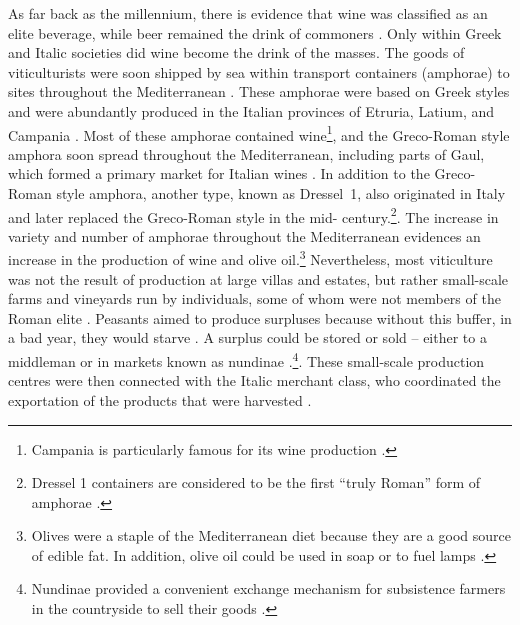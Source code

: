 As far back as the  millennium\BC, there is evidence that wine was classified as an elite beverage, while beer remained the drink of commoners \parencite[233]{Dietler_2006}. 
Only within Greek and Italic societies did wine become the drink of the masses. 
The goods of viticulturists were soon shipped by sea within transport containers (amphorae) to sites throughout the Mediterranean \parencite[9]{Moore_1995}. 
These amphorae were based on Greek styles and were abundantly produced in the Italian provinces of Etruria, Latium, and Campania \parencite[285]{Woolf_1992}. 
Most of these amphorae contained wine\footnote{Campania is particularly famous for its wine production \parencite[6]{Purcell_1985}.}, and the Greco-Roman style amphora soon spread throughout the Mediterranean, including parts of Gaul, which formed a primary market for Italian wines \parencites[141]{Tchernia_2006}[7]{Purcell_1985}[285]{Woolf_1992}. In addition to the Greco-Roman style amphora, another type, known as Dressel~1, also originated in Italy and later replaced the Greco-Roman style in the mid- century\BC \parencites[263]{Peacock_1977}[285]{Woolf_1992}.\footnote{Dressel 1 containers are considered to be the first “truly Roman” form of amphorae \parencite[86]{Toscana_1995}.}. 
The increase in variety and number of amphorae throughout the Mediterranean evidences an increase in the production of wine and olive oil.\footnote{Olives were a staple of the Mediterranean diet because they are a good source of edible fat. 
In addition, olive oil could be used in soap or to fuel lamps \parencite[31]{Finley_1999}.} Nevertheless, most viticulture was not the result of production at large villas and estates, but rather small-scale farms and vineyards run by individuals, some of whom were not members of the Roman elite \parencites[163]{Kron_2012}[7]{Purcell_1985}. Peasants aimed to produce surpluses because without this buffer, in a bad year, they would starve \parencite[22]{Bowman_2013}. A surplus could be stored or sold – either to a middleman or in markets known as nundinae \parencite[113]{Storey_2004}.\footnote{Nundinae provided a convenient exchange mechanism for subsistence farmers in the countryside to sell their goods \parencite[113]{Storey_2004}.}.  These small-scale production centres were then connected with the Italic merchant class, who coordinated the exportation of the products that were harvested \parencites[47]{Kehoe_2013}[8]{Purcell_1985}. 

